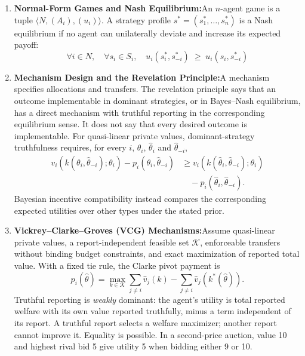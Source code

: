 \documentclass[11pt,a4paper]{article}
\begin{document}
\begin{enumerate}[leftmargin=1.8em,itemsep=3pt]
  \item \textbf{Normal-Form Games and Nash Equilibrium:}\enspace An $n$-agent game is a tuple $\langle N, (A_i), (u_i) \rangle$. A strategy profile $s^* = (s_1^*, \dots, s_n^*)$ is a Nash equilibrium if no agent can unilaterally deviate and increase its expected payoff:
  \begin{equation}
  \forall i \in N, \quad \forall s_i \in S_i, \quad u_i(s_i^*, s_{-i}^*) \;\ge\; u_i(s_i, s_{-i}^*)
  \end{equation}

  \item \textbf{Mechanism Design and the Revelation Principle:}\enspace A mechanism specifies allocations and transfers. The revelation principle says that an outcome implementable in dominant strategies, or in Bayes--Nash equilibrium, has a direct mechanism with truthful reporting in the corresponding equilibrium sense. It does not say that every desired outcome is implementable. For quasi-linear private values, dominant-strategy truthfulness requires, for every $i$, $\theta_i$, $\hat\theta_i$ and $\hat\theta_{-i}$,
  \begin{align}
  v_i(k(\theta_i,\hat\theta_{-i});\theta_i)-p_i(\theta_i,\hat\theta_{-i})
  &\ge v_i(k(\hat\theta_i,\hat\theta_{-i});\theta_i)\nonumber\\
  &\quad-p_i(\hat\theta_i,\hat\theta_{-i}).
  \end{align}
  Bayesian incentive compatibility instead compares the corresponding expected utilities over other types under the stated prior.

  \item \textbf{Vickrey--Clarke--Groves (VCG) Mechanisms:}\enspace Assume quasi-linear private values, a report-independent feasible set $\mathcal K$, enforceable transfers without binding budget constraints, and exact maximization of reported total value. With a fixed tie rule, the Clarke pivot payment is~
  \begin{equation}
  p_i(\hat\theta)=\max_{k\in\mathcal K}\sum_{j\ne i}\hat v_j(k)
  -\sum_{j\ne i}\hat v_j(k^*(\hat\theta)).
  \end{equation}
  Truthful reporting is \emph{weakly} dominant: the agent's utility is total reported welfare with its own value reported truthfully, minus a term independent of its report. A truthful report selects a welfare maximizer; another report cannot improve it. Equality is possible. In a second-price auction, value 10 and highest rival bid 5 give utility 5 when bidding either 9 or 10.


\end{enumerate}
\end{document}
